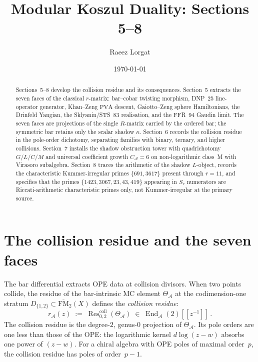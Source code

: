 \documentclass[11pt,reqno]{amsart}
\theoremstyle{definition}
\theoremstyle{remark}
\providecommand{\cA}{\mathcal{A}}
\providecommand{\FM}{\overline{\mathrm{FM}}}
\providecommand{\Res}{\operatorname{Res}}
\DeclareMathOperator{\End}{End}
\numberwithin{equation}{section}
\begin{document}
\title[Programme Summary: Sections 5--8]
{Modular Koszul Duality: Sections 5--8}

\author{Raeez Lorgat}
\address{Perimeter Institute for Theoretical Physics,
 Waterloo, ON N2L 2Y5, Canada}

\date{\today}

\begin{abstract}
Sections~5--8 develop the collision residue and its consequences.
Section~5 extracts the seven faces of the classical $r$-matrix:
bar--cobar twisting morphism, DNP~25 line-operator generator,
Khan--Zeng $\mathrm{PVA}$ descent, Gaiotto--Zeng sphere
Hamiltonians, the Drinfeld Yangian, the Sklyanin/STS~83
realisation, and the FFR~94 Gaudin limit. The seven faces are
projections of the single $R$-matrix carried by the ordered bar;
the symmetric bar retains only the scalar shadow $\kappa$.
Section~6 records the collision residue in the pole-order
dichotomy, separating families with binary, ternary, and higher
collisions. Section~7 installs the shadow obstruction tower with
quadrichotomy $G/L/C/M$ and universal coefficient growth
$C_\cA = 6$ on non-logarithmic class~M with Virasoro subalgebra.
Section~8 traces the arithmetic of the shadow $L$-object, records
the characteristic Kummer-irregular primes $\{691, 3617\}$
present through $r = 11$, and specifies that the primes
$\{1423, 3067, 23, 43, 419\}$
appearing in $S_r$ numerators are Riccati-arithmetic
characteristic primes only, not Kummer-irregular at the primary
source.
\end{abstract}

\maketitle

\section{The collision residue and the seven faces}
\label{sec:seven-faces}

The bar differential extracts OPE data at collision divisors.
When two points collide, the residue of the bar-intrinsic MC
element $\Theta_\cA$ at the codimension-one stratum
$D_{\{1,2\}} \subset \FM_2(X)$ defines the \emph{collision
residue}:
\begin{equation}\label{eq:collision-residue}
r_\cA(z)
\;:=\;
\Res^{\mathrm{coll}}_{0,2}(\Theta_\cA)
\;\in\;
\End_\cA(2)[\![z^{-1}]\!]\,.
\end{equation}
The collision residue is the degree-$2$, genus-$0$ projection
of $\Theta_\cA$. Its pole orders are one less than those of
the OPE: the logarithmic kernel $d\log(z-w)$ absorbs one
power of $(z - w)$. For a chiral algebra with OPE poles of
maximal order~$p$, the collision residue has poles of
order~$p - 1$.
\end{document}
